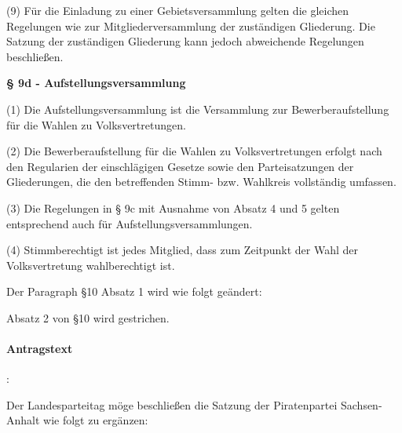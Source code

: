 {(9) Für die Einladung zu einer Gebietsversammlung gelten die gleichen Regelungen wie zur Mitgliederversammlung der zuständigen Gliederung. Die Satzung der zuständigen Gliederung kann jedoch abweichende Regelungen beschließen.

\textbf{§ 9d - Aufstellungsversammlung}

(1) Die Aufstellungsversammlung ist die Versammlung zur Bewerberaufstellung für die Wahlen zu Volksvertretungen.

(2) Die Bewerberaufstellung für die Wahlen zu Volksvertretungen erfolgt nach den Regularien der einschlägigen Gesetze sowie den Parteisatzungen der Gliederungen, die den betreffenden Stimm- bzw. Wahlkreis vollständig umfassen.

(3) Die Regelungen in § 9c mit Ausnahme von Absatz 4 und 5 gelten entsprechend auch für Aufstellungsversammlungen.

(4) Stimmberechtigt ist jedes Mitglied, dass zum Zeitpunkt der Wahl der Volksvertretung wahlberechtigt ist.}

Der Paragraph §10 Absatz 1 wird wie folgt geändert:


Absatz 2 von §10 wird gestrichen. 




\paragraph{Antragstext}:

Der Landesparteitag möge beschließen die Satzung der Piratenpartei Sachsen-Anhalt wie folgt zu ergänzen:

